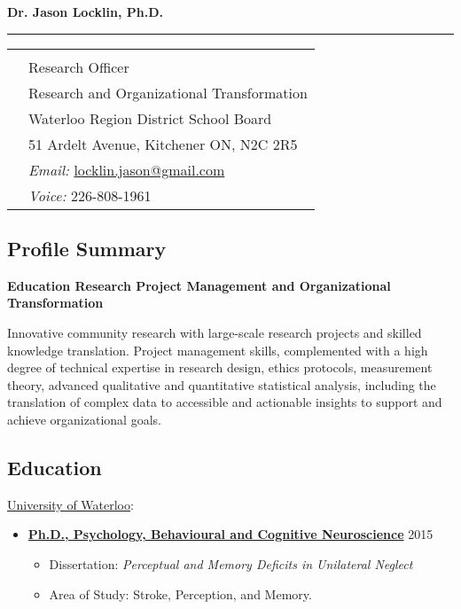 \documentclass[10pt]{article}
\newcommand{\makeheading}[1]%
        {\hspace*{-\marginparsep minus \marginparwidth}%
         \begin{minipage}[t]{\textwidth+\marginparwidth+\marginparsep}%
                {\large \bfseries #1}\\[ -0.15\baselineskip]%
                 \rule{\columnwidth}{1pt}%
         \end{minipage}}
\providecommand{\tightlist}{%
  \setlength{\itemsep}{0pt}\setlength{\parskip}{0pt}}
\begin{document}
\newlength{\rcollength}\setlength{\rcollength}{3in}

\makeheading{Dr. Jason Locklin, Ph.D.}

\begin{tabular}[t]{@{}p{\textwidth-\rcollength}p{\rcollength}}
    & \\
  & Research Officer\\
  & Research and Organizational Transformation \\
  & Waterloo Region District School Board \\
  & 51 Ardelt Avenue, Kitchener ON, N2C 2R5 \\
  & \textit{Email:} \href{mailto:locklin.jason@gmail.com}{locklin.jason@gmail.com}\\
  & \textit{Voice:} 226-808-1961\

\end{tabular}

\subsection{Profile Summary}\label{profile-summary}

\textbf{Education Research Project Management and Organizational
Transformation}

Innovative community research with large-scale research projects and
skilled knowledge translation. Project management skills, complemented
with a high degree of technical expertise in research design, ethics
protocols, measurement theory, advanced qualitative and quantitative
statistical analysis, including the translation of complex data to
accessible and actionable insights to support and achieve organizational
goals.

\subsection{Education}\label{education}

\href{http://www.uwaterloo.ca/}{University of Waterloo}:

\begin{itemize}
\item
  \href{http://psychology.uwaterloo.ca}{\textbf{Ph.D., Psychology,
  Behavioural and Cognitive Neuroscience}} \hfill 2015

  \begin{itemize}
  \tightlist
  \item
    Dissertation: \emph{Perceptual and Memory Deficits in Unilateral
    Neglect}
  \item
    Area of Study: Stroke, Perception, and Memory.
  \end{itemize}
\end{itemize}
\end{document}
